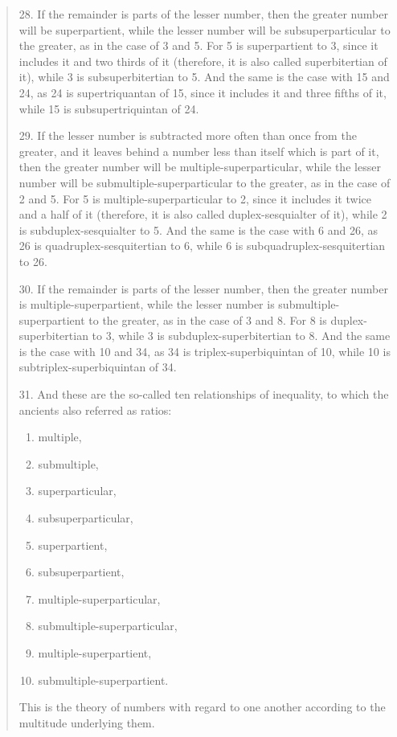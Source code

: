 \documentclass{article}
\begin{document}
\begin{quote}
28. If the remainder is parts of the lesser number, then the greater number will be
superpartient, while the lesser number will be subsuperparticular to the greater, as in the
case of 3 and 5. For 5 is superpartient to 3, since it includes it and two thirds of it (therefore,
it is also called superbitertian of it), while 3 is subsuperbitertian to 5. And the same
is the case with 15 and 24, as 24 is supertriquantan of 15, since it includes it and three
fifths of it, while 15 is subsupertriquintan of 24.

29. If the lesser number is subtracted more often than once from the greater, and it
leaves behind a number less than itself which is part of it, then the greater number
will be multiple-superparticular, while the lesser number will be submultiple-superparticular
to the greater, as in the case of 2 and 5. For 5 is multiple-superparticular to 2,
since it includes it twice and a half of it (therefore, it is also called duplex-sesquialter of
it), while 2 is subduplex-sesquialter to 5. And the same is the case with 6 and 26, as 26 is
quadruplex-sesquitertian to 6, while 6 is subquadruplex-sesquitertian to 26.

30. If the  remainder is parts of the lesser number, then the greater number is multiple-superpartient,
while the lesser number is submultiple-superpartient to the greater,
as in the case of 3 and 8. For 8 is duplex-superbitertian to 3, while 3 is subduplex-superbitertian
to 8. And the same is the case with 10 and 34, as 34 is triplex-superbiquintan
of 10, while 10 is subtriplex-superbiquintan of 34.

31. And these are the so-called ten relationships of inequality, to which the ancients
also referred as ratios:
\begin{enumerate}
\item multiple,
\item submultiple,
\item superparticular,
\item subsuperparticular,
\item superpartient,
\item subsuperpartient,
\item multiple-superparticular, 
\item submultiple-superparticular,
\item multiple-superpartient,
\item submultiple-superpartient.
\end{enumerate}
This is the theory of numbers with regard
to one another according to the multitude underlying them.
\end{quote}
\end{document}
